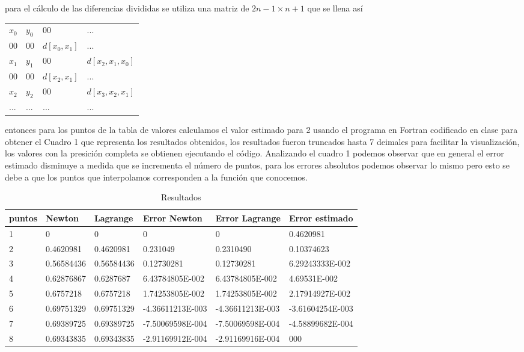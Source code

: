 \documentclass[10pt,twocolumn]{article}
\begin{document}
para el c\'alculo de las diferencias divididas se utiliza una matriz de $2n-1 \times n+1$ que se llena as\'i
\begin{tabular}[b]{|l|l|l|l}
	\hline
	$x_0$ & $y_0$ & 00 & $...$ \\
	00 & 00 & $d[x_0,x_1]$ & $...$ \\
	$x_1$ & $y_1$ & 00 & $d[x_2,x_1,x_0]$ \\
	00 & 00 & $d[x_2,x_1]$ & $...$ \\
	$x_2$ & $y_2$ & 00 & $d[x_3,x_2,x_1]$ \\
	$...$ & $...$ & $...$ & $...$ \\ \hline
\end{tabular}

entonces para los puntos de la tabla de valores calculamos el valor estimado para 2 usando el 
programa en Fortran codificado en clase para obtener el Cuadro 1 que representa los resultados obtenidos, los resultados fueron truncados hasta 7 
deimales para facilitar la visualizaci\'on, los valores con la presici\'on completa se obtienen ejecutando el c\'odigo. Analizando 
el cuadro 1 podemos observar que en 
general el error estimado disminuye a medida que se incrementa el n\'umero de puntos, para los errores absolutos podemos observar lo mismo pero esto se 
debe a que los puntos que interpolamos corresponden a la funci\'on que conocemos.

 

\begin{table*}[t]
	\centering
	\begin{tabular}{|l|l|l|l|l|l|}
		\hline
		puntos & Newton & Lagrange & Error Newton & Error Lagrange & Error estimado \\
		\hline
		1 & 0 & 0 & 0 & 0 & 0.4620981 \\ \hline
		2 & 0.4620981  & 0.4620981 & 0.231049 & 0.2310490 & 0.10374623 \\ \hline
		3 &0.56584436 &0.56584436  &0.12730281 &0.12730281 & 6.29243333E-002 \\ \hline
		4 & 0.62876867 & 0.6287687 & 6.43784805E-002& 6.43784805E-002 & 4.69531E-002 \\ \hline
		5 & 0.6757218 & 0.6757218& 1.74253805E-002 & 1.74253805E-002 & 2.17914927E-002 \\ \hline
		6 & 0.69751329 &0.69751329 &-4.36611213E-003 &-4.36611213E-003 &-3.61604254E-003 \\ \hline
		7 & 0.69389725 & 0.69389725 &-7.50069598E-004 &-7.50069598E-004 &-4.58899682E-004 \\ \hline
		8 & 0.69343835 & 0.69343835 &-2.91169912E-004 &-2.91169916E-004 & 000 \\ \hline
	\end{tabular}
	\caption{Resultados}
\end{table*}
\end{document}
